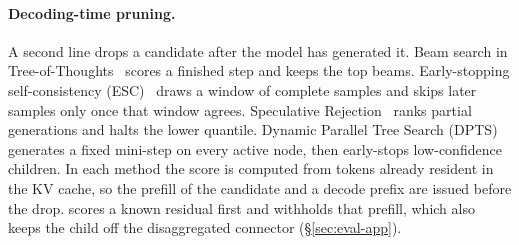 \paragraph{Decoding-time pruning.}
A second line drops a candidate after the model has generated it.
Beam search in Tree-of-Thoughts~\cite{tot} scores a finished step and keeps the top beams.
Early-stopping self-consistency (ESC)~\cite{esc} draws a window of complete samples and skips later samples only once that window agrees.
Speculative Rejection~\cite{specrej} ranks partial generations and halts the lower quantile.
Dynamic Parallel Tree Search (DPTS)~\cite{dpts} generates a fixed mini-step on every active node, then early-stops low-confidence children.
In each method the score is computed from tokens already resident in the KV cache, so the prefill of the candidate and a decode prefix are issued before the drop.
\app scores a known residual first and withholds that prefill, which also keeps the child off the disaggregated connector (\S\ref{sec:eval-app}).

